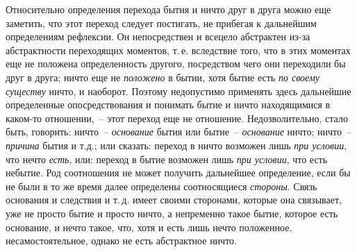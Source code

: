 
Относительно определения перехода бытия и ничто
друг в друга можно еще заметить, что этот переход следует
постигать, не прибегая к дальнейшим определениям
рефлексии. Он непосредствен и всецело абстрактен из-за
абстрактности переходящих моментов, т.\,е. вследствие
того, что в этих моментах еще не положена определенность
другого, посредством чего они переходили бы друг
в друга; ничто еще не \emph{положено} в бытии, хотя бытие есть
\emph{по своему существу} ничто, и наоборот. Поэтому недопустимо
применять здесь дальнейшие определенные опосредствования
и понимать бытие и ничто находящимися
в каком-то отношении,~-- этот переход еще не отношение.
Недозволительно, стало быть, говорить: ничто~-- \emph{основание}
бытия или бытие~-- \emph{основание} ничто; ничто~-- \emph{причина}
бытия и т.д.; или сказать: переход в ничто возможен
лишь \emph{при условии}, что нечто \emph{есть}, или: переход в бытие
возможен лишь \emph{при условии}, что есть небытие. Род соотношения
не может получить дальнейшее определение,
если бы не были в то же время далее определены соотносящиеся
\emph{стороны}. Связь основания и следствия и т.\,д.
имеет своими сторонами, которые она связывает, уже не
просто бытие и просто ничто, а непременно такое бытие,
которое есть основание, и нечто такое, что, хотя и есть
лишь нечто положенное, несамостоятельное, однако не
есть абстрактное ничто.

